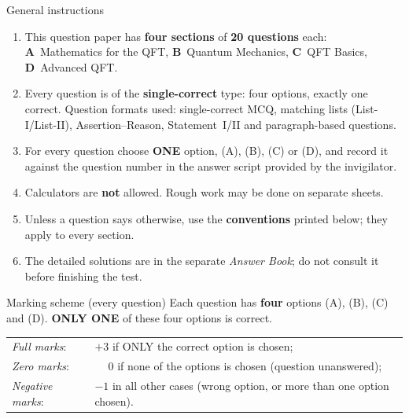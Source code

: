\documentclass[11pt,a4paper]{article}
\begin{document}
\vspace{6pt}
\begin{infobox}{General instructions}
\begin{enumerate}[leftmargin=1.4em, itemsep=1pt, topsep=1pt]
\item This question paper has \textbf{four sections} of \textbf{20 questions} each:
\textbf{A}~Mathematics for the QFT, \textbf{B}~Quantum Mechanics, \textbf{C}~QFT Basics, \textbf{D}~Advanced QFT.
\item Every question is of the \textbf{single-correct} type: four options, exactly one correct. Question formats used:
single-correct MCQ, matching lists (List-I/List-II), Assertion--Reason, Statement~I/II and paragraph-based questions.
\item For every question choose \textbf{ONE} option, (A), (B), (C) or (D), and record it against the question number in the answer script provided by the invigilator.
\item Calculators are \textbf{not} allowed. Rough work may be done on separate sheets.
\item Unless a question says otherwise, use the \textbf{conventions} printed below; they apply to every section.
\item The detailed solutions are in the separate \emph{Answer Book}; do not consult it before finishing the test.
\end{enumerate}
\end{infobox}
\begin{infobox}{Marking scheme (every question)}
Each question has \textbf{four} options (A), (B), (C) and (D). \textbf{ONLY ONE} of these four options is correct.\\[2pt]
\begin{tabular}{@{}ll@{}}
\emph{Full marks}: & $+3$ if ONLY the correct option is chosen;\\
\emph{Zero marks}: & $\phantom{+}0$ if none of the options is chosen (question unanswered);\\
\emph{Negative marks}: & $-1$ in all other cases (wrong option, or more than one option chosen).
\end{tabular}
\end{infobox}
\end{document}
